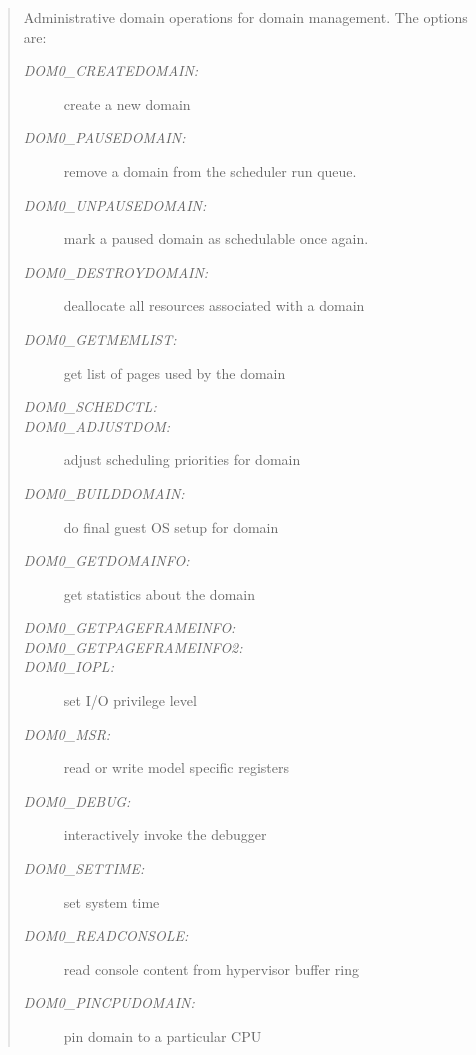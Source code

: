 \documentclass[11pt,twoside,final,openright]{report}
\begin{document}
\begin{quote}

Administrative domain operations for domain management. The options are:

\begin{description} 
\item [\it DOM0\_CREATEDOMAIN:] create a new domain

\item [\it DOM0\_PAUSEDOMAIN:] remove a domain from the scheduler run 
queue. 

\item [\it DOM0\_UNPAUSEDOMAIN:] mark a paused domain as schedulable
  once again. 

\item [\it DOM0\_DESTROYDOMAIN:] deallocate all resources associated
with a domain

\item [\it DOM0\_GETMEMLIST:] get list of pages used by the domain

\item [\it DOM0\_SCHEDCTL:]

\item [\it DOM0\_ADJUSTDOM:] adjust scheduling priorities for domain

\item [\it DOM0\_BUILDDOMAIN:] do final guest OS setup for domain

\item [\it DOM0\_GETDOMAINFO:] get statistics about the domain

\item [\it DOM0\_GETPAGEFRAMEINFO:] 

\item [\it DOM0\_GETPAGEFRAMEINFO2:]

\item [\it DOM0\_IOPL:] set I/O privilege level

\item [\it DOM0\_MSR:] read or write model specific registers

\item [\it DOM0\_DEBUG:] interactively invoke the debugger

\item [\it DOM0\_SETTIME:] set system time

\item [\it DOM0\_READCONSOLE:] read console content from hypervisor buffer ring

\item [\it DOM0\_PINCPUDOMAIN:] pin domain to a particular CPU


\end{description}
\end{quote}
\end{document}
